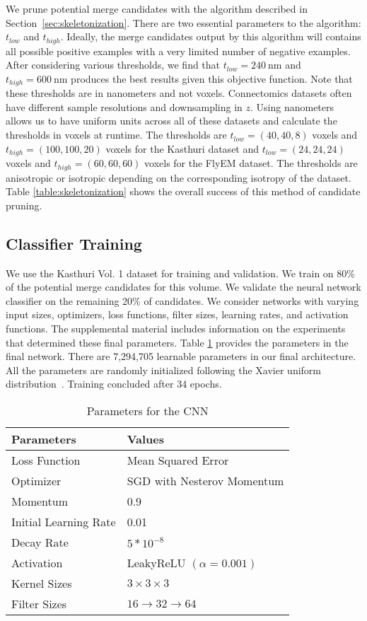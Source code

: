 We prune potential merge candidates with the algorithm described in Section~\ref{sec:skeletonization}. 
There are two essential parameters to the algorithm: $t_{low}$ and $t_{high}$. 
Ideally, the merge candidates output by this algorithm will contains all possible positive examples with a very limited number of negative examples. 
After considering various thresholds, we find that $t_{low} = \SI{240}{\nano\meter}$ and $t_{high} = \SI{600}{\nano\meter}$ produces the best results given this objective function. 
Note that these thresholds are in nanometers and not voxels. 
Connectomics datasets often have different sample resolutions and downsampling in $z$. 
Using nanometers allows us to have uniform units across all of these datasets and calculate the thresholds in voxels at runtime. 
The thresholds are $t_{low} = (40, 40, 8)$ voxels and $t_{high} = (100, 100, 20)$ voxels for the Kasthuri dataset and $t_{low} = (24, 24, 24)$ voxels and $t_{high} = (60, 60, 60)$ voxels for the FlyEM dataset.
The thresholds are anisotropic or isotropic depending on the corresponding isotropy of the dataset.
Table \ref{table:skeletonization} shows the overall success of this method of candidate pruning.

\subsection{Classifier Training}
\label{sec:network-parameters}
We use the Kasthuri Vol. 1 dataset for training and validation. 
We train on 80\% of the potential merge candidates for this volume.
We validate the neural network classifier on the remaining 20\% of candidates. 
We consider networks with varying input sizes, optimizers, loss functions, filter sizes, learning rates, and activation functions. 
The supplemental material includes information on the experiments that determined these final parameters. 
Table \ref{table:architecture} provides the parameters in the final network.
There are 7,294,705 learnable parameters in our final architecture.
All the parameters are randomly initialized following the Xavier uniform distribution~\cite{glorot2010understanding}. 
Training concluded after 34 epochs. 

\begin{table}[h!]
	\centering
	\begin{tabular}{l l} \hline
		\textbf{Parameters} & \textbf{Values} \\ \hline
		Loss Function & Mean Squared Error \\
		Optimizer & SGD  with Nesterov Momentum \\
		Momentum & 0.9 \\
		Initial Learning Rate & 0.01 \\
		Decay Rate & $5 * 10^{-8}$ \\
		Activation & LeakyReLU $(\alpha = 0.001)$ \\
		Kernel Sizes & $3 \times 3 \times 3$ \\
		Filter Sizes & $16 \to 32 \to 64$ \\ \hline
	\end{tabular}
	\caption{Parameters for the CNN}
	\label{table:architecture}
\end{table}



